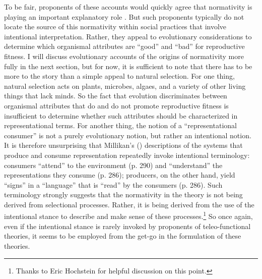 To be fair, proponents of these accounts would quickly agree that normativity is playing an important explanatory role \citep[e.g.,][]{Millikan:1989,Dennett:1987}. But such proponents typically do not locate the source of this normativity within social practices that involve intentional interpretation. Rather, they appeal to evolutionary considerations to determine which organismal attributes are ``good'' and ``bad'' for reproductive fitness. I will discuss evolutionary accounts of the origins of normativity more fully in the next section, but for now, it is sufficient to note that there has to be more to the story than a simple appeal to natural selection. For one thing, natural selection acts on plants, microbes, algaes, and a variety of other living things that lack minds. So the fact that evolution discriminates between organismal attributes that do and do not promote reproductive fitness is insufficient to determine whether such attributes should be characterized in representational terms. For another thing, the notion of a ``representational consumer'' is not a purely evolutionary notion, but rather an intentional notion. It is therefore unsurprising that Millikan's (\citeyear{Millikan:1987}) descriptions of the systems that produce and consume representation repeatedly invoke intentional terminology: consumers ``attend'' to the environment (p. 290) and ``understand'' the representations they consume (p. 286); producers, on the other hand, yield ``signs'' in a ``language'' that is ``read'' by the consumers (p. 286). Such terminology strongly suggests that the normativity in the theory is not being derived from selectional processes. Rather, it is being derived from the use of the intentional stance to describe and make sense of these processes.\footnote{Thanks to Eric Hochstein for helpful discussion on this point.} So once again, even if the intentional stance is rarely invoked by proponents of teleo-functional theories, it seems to be employed from the get-go in the formulation of these theories.  

